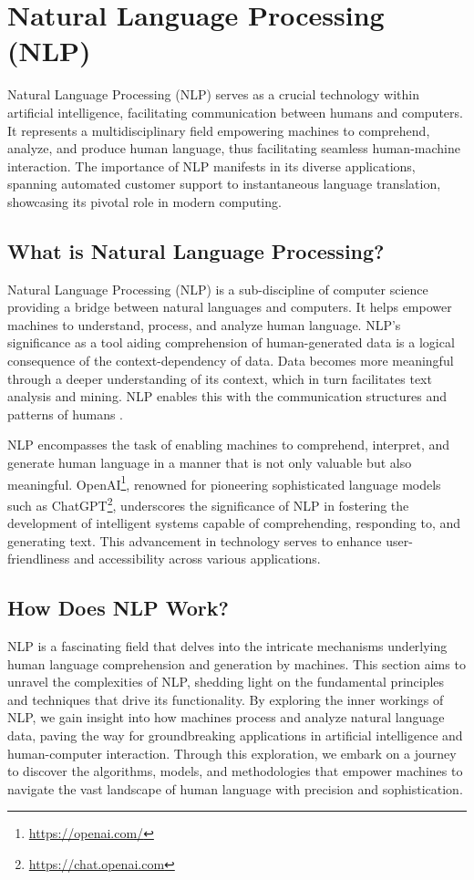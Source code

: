 \section{Natural Language Processing (NLP)}

Natural Language Processing (NLP) serves as a crucial technology within artificial intelligence, facilitating communication between humans and computers. It represents a multidisciplinary field empowering machines to comprehend, analyze, and produce human language, thus facilitating seamless human-machine interaction. The importance of NLP manifests in its diverse applications, spanning automated customer support to instantaneous language translation, showcasing its pivotal role in modern computing.

\subsection{What is Natural Language Processing?}

Natural Language Processing (NLP) is a sub-discipline of computer science providing a bridge between natural languages and computers. It helps empower machines to understand, process, and analyze human language. NLP's significance as a tool aiding comprehension of human-generated data is a logical consequence of the context-dependency of data. Data becomes more meaningful through a deeper understanding of its context, which in turn facilitates text analysis and mining. NLP enables this with the communication structures and patterns of humans \cite{torfi2021natural}.

NLP encompasses the task of enabling machines to comprehend, interpret, and generate human language in a manner that is not only valuable but also meaningful. OpenAI\footnote{\url{https://openai.com/}}, renowned for pioneering sophisticated language models such as ChatGPT\footnote{\url{https://chat.openai.com}}, underscores the significance of NLP in fostering the development of intelligent systems capable of comprehending, responding to, and generating text. This advancement in technology serves to enhance user-friendliness and accessibility across various applications.

\subsection{How Does NLP Work?}

NLP is a fascinating field that delves into the intricate mechanisms underlying human language comprehension and generation by machines. This section aims to unravel the complexities of NLP, shedding light on the fundamental principles and techniques that drive its functionality. By exploring the inner workings of NLP, we gain insight into how machines process and analyze natural language data, paving the way for groundbreaking applications in artificial intelligence and human-computer interaction. Through this exploration, we embark on a journey to discover the algorithms, models, and methodologies that empower machines to navigate the vast landscape of human language with precision and sophistication.


